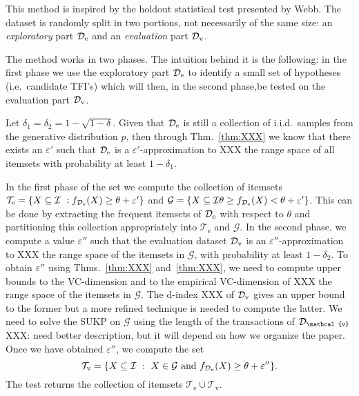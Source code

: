 \documentclass{article}
\newcommand{\Ds}{{\cal D}}
\def\Itm{{\cal I}}
\begin{document}
\title{ }
\author{ }

This method is inspired by the holdout statistical test presented by Webb. The
dataset is randomly split in two portions, not necessarily of the same size: an
\emph{exploratory} part $\Ds_\mathrm{e}$ and an
\emph{evaluation} part $\Ds_\mathrm{v}$. 

The method works in two phases. The intuition behind it is the following: in the
first phase we use the exploratory part
$\Ds_\mathrm{e}$ to identify a small set of hypotheses (i.e.~candidate TFI's)
which will then, in the second phase,be tested on the evaluation part $\Ds_\mathrm{v}$. 

Let $\delta_1=\delta_2=1-\sqrt{1-\delta}$. Given that $\Ds_\mathrm{e}$ is still
a collection of i.i.d.~samples from the generative distribution $p$, then
through Thm.~\ref{thm:XXX} we know that there exists an $\varepsilon'$ such that
$\Ds_\mathrm{e}$ is a $\varepsilon'$-approximation to XXX the range space of all
itemsets with probability at least $1-\delta_1$. 

In the first phase of the set we compute the collection of itemsets
$\mathcal{T}_\mathrm{e}=\{X\subseteq\Itm ~:
f_{\Ds_\mathrm{e}}(X)\ge\theta+\varepsilon'\}$
and $\mathcal{G}=\{X\subseteq\Itm \theta\ge
f_{\Ds_\mathrm{e}}(X)<\theta+\varepsilon'\}$. This can be done by extracting the
frequent itemsets of $\Ds_\mathrm{e}$ with respect to $\theta$ and partitioning
this collection appropriately into $\mathcal{T}_\mathrm{e}$ and $\mathcal{G}$.
In the second phase, we compute a value $\varepsilon''$ such that the evaluation dataset
$\Ds_\mathrm{v}$ is an $\varepsilon''$-approximation to XXX the range space of
the itemsets in $\mathcal{G}$, with
probability at least $1-\delta_2$. To obtain $\varepsilon''$ using
Thms.~\ref{thm:XXX} and~\ref{thm:XXX}, we need to compute upper bounds to the
VC-dimension and to the empirical VC-dimension of XXX the range space of
the itemsets in $\mathcal{G}$. The d-index {XXX} of
$\Ds_\mathrm{v}$ gives an upper bound to the former but a more refined
technique is needed to compute the latter. We need to solve the SUKP on
$\mathcal{G}$ using the length of the transactions of $\Ds_\mathcal{v}$ {XXX:
need better description, but it will depend on how we organize the paper}.
Once we have obtained $\varepsilon''$, we compute the set
\[
\mathcal{T}_\mathrm{v}=\{X\subseteq\Itm ~:~ X\in\mathcal{G} \mbox{ and }
f_{\Ds_\mathrm{v}}(X)\ge\theta+\varepsilon''\}.\]
The test returns the collection of itemsets $\mathcal{T}_\mathrm{e}\cup\mathcal{T}_\mathrm{v}$.
\end{document}
